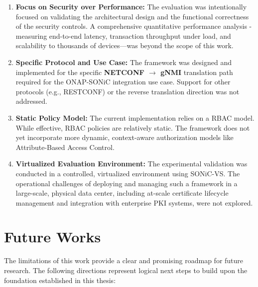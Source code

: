 \documentclass[12pt, a4paper, reqno, oneside]{book}
\newcommand \sect[1]{%
  \section*{#1}%
  \addcontentsline{toc}{section}{#1}}
\begin{document}
\begin{enumerate}
    \item \textbf{Focus on Security over Performance:} The evaluation was intentionally focused on validating the architectural design and the functional correctness of the security controls. A comprehensive quantitative performance analysis - measuring end-to-end latency, transaction throughput under load, and scalability to thousands of devices—was beyond the scope of this work.
    
    \item \textbf{Specific Protocol and Use Case:} The framework was designed and implemented for the specific \textbf{NETCONF $\rightarrow$ gNMI} translation path required for the ONAP-SONiC integration use case. Support for other protocols (e.g., RESTCONF) or the reverse translation direction was not addressed.
    
    \item \textbf{Static Policy Model:} The current implementation relies on a RBAC model. While effective, RBAC policies are relatively static. The framework does not yet incorporate more dynamic, context-aware authorization models like Attribute-Based Access Control.
    
    \item \textbf{Virtualized Evaluation Environment:} The experimental validation was conducted in a controlled, virtualized environment using SONiC-VS. The operational challenges of deploying and managing such a framework in a large-scale, physical data center, including at-scale certificate lifecycle management and integration with enterprise PKI systems, were not explored.
\end{enumerate}

\newpage
\sect{Future Works}
\label{sec:future_works}

The limitations of this work provide a clear and promising roadmap for future research. The following directions represent logical next steps to build upon the foundation established in this thesis:
\end{document}
